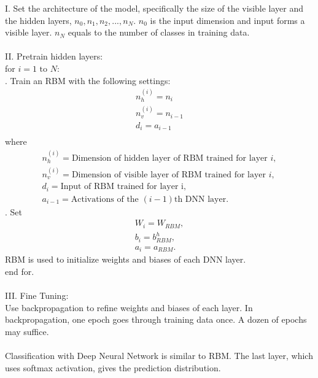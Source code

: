 \documentclass[12pt]{article}
\begin{document}
I. Set the architecture of the model, specifically the size of the visible layer and the hidden layers, \(n_0, n_1, n_2, ..., n_N\). $n_0$ is the input dimension and input forms a visible layer. $n_N$ equals to the number of classes in training data.\\
\\
II. Pretrain hidden layers:\\
for $i = 1\text{ to }N $:\\
. Train an RBM with the following settings:\\
\begin{gather*}
n_h^{(i)}=n_i\\
n_v^{(i)}=n_{i-1}\\
d_i=a_{i-1}\\
\end{gather*}
\indent where
\begin{gather*}
n_h^{(i)} = \text{Dimension of hidden layer of RBM trained for layer }i,\\
n_v^{(i)} = \text{Dimension of visible layer of RBM trained for layer }i,\\
d_i = \text{Input of RBM trained for layer i},\\
a_{i-1} = \text{Activations of the }(i-1)\text{th DNN layer}.
\end{gather*}
. Set \begin{gather*}
W_i = W_{RBM},\\
b_i = b^h_{RBM},\\
a_i = a_{RBM}.
\end{gather*}
\indent RBM is used to initialize weights and biases of each DNN layer.\\
end for.\\
\\
III. Fine Tuning:\\
Use backpropagation to refine weights and biases of each layer. In backpropagation, one epoch goes through training data once. A dozen of epochs may suffice.\\
\\
Classification with Deep Neural Network is similar to RBM. The last layer, which uses softmax activation, gives the prediction distribution.
\end{document}
